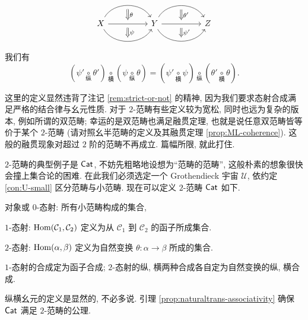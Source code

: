 \begin{definition}
\begin{enumerate}[(i)]
\[\begin{tikzcd}
			X
			\arrow[bend left=60, rr, ""' name=U]
			\arrow[rr, "" name=MM, ""' name=M]
			\arrow[bend right=60, rr, "" name=D] & &
			\arrow[Rightarrow, to path=(U) -- (MM) \tikztonodes, "\theta"] \arrow[Rightarrow, to path=  (M) -- (D) \tikztonodes, "\psi"] Y
			\arrow[bend left=60, rr, ""' name=V]
			\arrow[rr, "" name=NN, ""' name=N]
			\arrow[bend right=60, rr, "" name=E] & &
			\arrow[Rightarrow, to path=(V) -- (NN) \tikztonodes, "\theta'"] \arrow[Rightarrow, to path=  (N) -- (E) \tikztonodes, "\psi'"] Z
		\end{tikzcd} \]
		我们有
		\[ \left( \psi' \underset{\text{纵}}{\circ} \theta'\right) \underset{\text{横}}{\circ} \left( \psi \underset{\text{纵}}{\circ} \theta\right) = \left( \psi' \underset{\text{横}}{\circ} \psi \right) \underset{\text{纵}}{\circ} \left( \theta' \underset{\text{横}}{\circ} \theta\right).  \]
	\end{enumerate}
\end{definition}

\begin{remark}
	这里的定义显然违背了注记 \ref{rem:strict-or-not} 的精神, 因为我们要求态射合成满足严格的结合律与幺元性质. 对于 $2$-范畴有些定义较为宽松, 同时也远为复杂的版本, 例如所谓的双范畴; 幸运的是双范畴也满足融贯定理, 也就是说任意双范畴皆等价于某个 $2$-范畴 (请对照幺半范畴的定义及其融贯定理 \ref{prop:ML-coherence}). 这般的融贯现象对超过 $2$ 阶的范畴不再成立. 篇幅所限, 就此打住.
\end{remark}

\begin{example}\label{eg:Cat}
	$2$-范畴的典型例子是 $\mathsf{Cat}$, 不妨先粗略地设想为``范畴的范畴'', 这般朴素的想象很快会撞上集合论的困难. 在此我们必须选定一个 Grothendieck 宇宙 $\mathcal{U}$, 依约定 \ref{con:U-small} 区分范畴与小范畴. 现在可以定义 $2$-范畴 $\mathsf{Cat}$ 如下.
	\begin{compactitem}
		\item 对象或 $0$-态射: 所有小范畴构成的集合,
		\item $1$-态射: $\operatorname{Hom}(\mathcal{C}_1, \mathcal{C}_2)$ 定义为从 $\mathcal{C}_1$ 到 $\mathcal{C}_2$ 的函子所成集合.
		\item $2$-态射: $\operatorname{Hom}(\alpha, \beta)$ 定义为自然变换 $\theta: \alpha \to \beta$ 所成的集合.
		\item $1$-态射的合成定为函子合成; $2$-态射的纵, 横两种合成各自定为自然变换的纵, 横合成.
	\end{compactitem}
	纵横幺元的定义是显然的, 不必多说. 引理 \ref{prop:naturaltrans-associativity} 确保 $\mathsf{Cat}$ 满足 $2$-范畴的公理.
\end{example}

